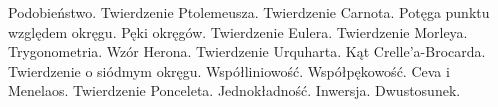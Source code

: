 Podobieństwo.
Twierdzenie Ptolemeusza.
Twierdzenie Carnota.
Potęga punktu względem okręgu.
Pęki okręgów.
Twierdzenie Eulera.
Twierdzenie Morleya.
Trygonometria. Wzór Herona.
Twierdzenie Urquharta.
Kąt Crelle'a-Brocarda.
Twierdzenie o siódmym okręgu.
Współliniowość.
Współpękowość.
Ceva i Menelaos.
Twierdzenie Ponceleta.
Jednokładność.
Inwersja.
Dwustosunek.